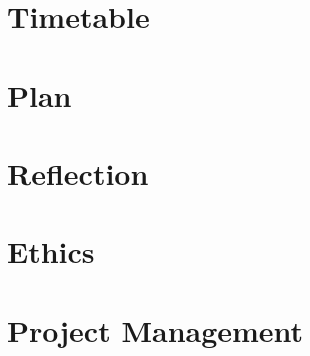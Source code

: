 \documentclass[11pt]{article}
\begin{document}
\section*{Timetable}

\section*{Plan}

\section*{Reflection}

\section*{Ethics}

\section*{Project Management}


\clearpage
{}
\end{document}
